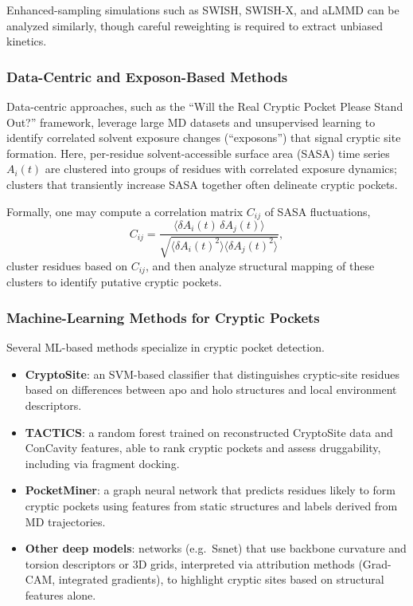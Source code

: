\documentclass[12pt,a4paper]{article}
\begin{document}
Enhanced-sampling simulations such as SWISH, SWISH-X, and aLMMD can be analyzed similarly, though careful reweighting is required to extract unbiased kinetics.\cite{CH5_Ng2022aLMMD,CH5_Borsatto2024SWISHX,CH5_zhang2026decrypting}

\subsubsection{Data-Centric and Exposon-Based Methods}

Data-centric approaches, such as the ``Will the Real Cryptic Pocket Please Stand Out?'' framework, leverage large MD datasets and unsupervised learning to identify correlated solvent exposure changes (``exposons'') that signal cryptic site formation.\cite{CH5_amaro2019will} Here, per-residue solvent-accessible surface area (SASA) time series \(A_i(t)\) are clustered into groups of residues with correlated exposure dynamics; clusters that transiently increase SASA together often delineate cryptic pockets.

Formally, one may compute a correlation matrix \(C_{ij}\) of SASA fluctuations,
\begin{equation}
C_{ij} = \frac{\langle \delta A_i(t) \, \delta A_j(t) \rangle}{\sqrt{\langle \delta A_i(t)^2 \rangle \langle \delta A_j(t)^2 \rangle}},
\end{equation}
cluster residues based on \(C_{ij}\), and then analyze structural mapping of these clusters to identify putative cryptic pockets.\cite{CH5_amaro2019will,CH5_Kuzmanic2020}

\subsubsection{Machine-Learning Methods for Cryptic Pockets}

Several ML-based methods specialize in cryptic pocket detection.\cite{CH5_Gasparikova2025,CH5_zhang2026decrypting}
\begin{itemize}
    \item \textbf{CryptoSite}: an SVM-based classifier that distinguishes cryptic-site residues based on differences between apo and holo structures and local environment descriptors.
    \item \textbf{TACTICS}: a random forest trained on reconstructed CryptoSite data and ConCavity features, able to rank cryptic pockets and assess druggability, including via fragment docking.
    \item \textbf{PocketMiner}: a graph neural network that predicts residues likely to form cryptic pockets using features from static structures and labels derived from MD trajectories.\cite{CH5_meller2023predicting}
    \item \textbf{Other deep models}: networks (e.g.\ Ssnet) that use backbone curvature and torsion descriptors or 3D grids, interpreted via attribution methods (Grad-CAM, integrated gradients), to highlight cryptic sites based on structural features alone.\cite{CH5_Gasparikova2025}
\end{itemize}
\end{document}

